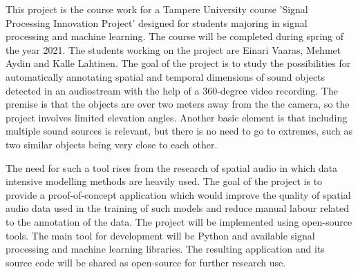 This project is the course work for a Tampere University course 'Signal Processing Innovation Project' designed for students majoring in signal processing and machine learning. The course will be completed during spring of the year 2021. The students working on the project are Einari Vaaras, Mehmet Aydin and Kalle Lahtinen. The goal of the project is to study the possibilities for automatically annotating spatial and temporal dimensions of sound objects detected in an audiostream with the help of a 360-degree video recording. The premise is that the objects are over two meters away from the the camera, so the project involves limited elevation angles. Another basic element is that including multiple sound sources is relevant, but there is no need to go to extremes, such as two similar objects being very close to each other.

The need for such a tool rises from the research of spatial audio in which data intensive modelling methods are heavily used. The goal of the project is to provide a proof-of-concept application which would improve the quality of spatial audio data used in the training of such models and reduce manual labour related to the annotation of the data. The project will be implemented using open-source tools. The main tool for development will be Python and available signal processing and machine learning libraries. The resulting application and its source code will be shared as open-source for further research use.
